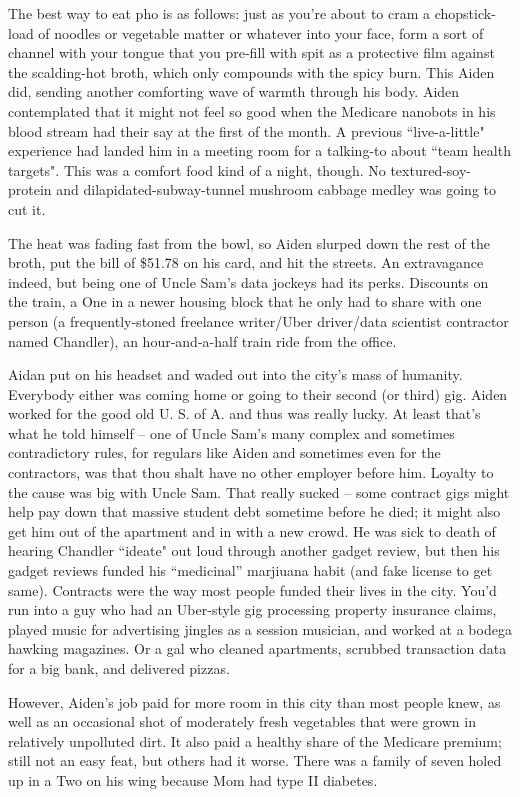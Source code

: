 \documentclass[11pt]{book}
\begin{document}
	The best way to eat pho is as follows: just as you're about to cram a chopstick-load of noodles or vegetable matter or whatever into your face, form a sort of channel with your tongue that you pre-fill with spit as a protective film against the scalding-hot broth, which only compounds with the spicy burn. This Aiden did, sending another comforting wave of warmth through his body. Aiden contemplated that it might not feel so good when the Medicare nanobots in his blood stream had their say at the first of the month. A previous ``live-a-little" experience had landed him in a meeting room for a talking-to about ``team health targets". This was a comfort food kind of a night, though. No textured-soy-protein and dilapidated-subway-tunnel mushroom cabbage medley was going to cut it.
	
	The heat was fading fast from the bowl, so Aiden slurped down the rest of the broth, put the bill of \$51.78 on his card, and hit the streets. An extravagance indeed, but being one of Uncle Sam's data  jockeys had its perks. Discounts on the train, a One in a newer housing block that he only had to share with one person (a frequently-stoned freelance writer/Uber driver/data scientist contractor named Chandler), an hour-and-a-half train ride from the office.
	
	Aidan put on his headset and waded out into the city's mass of humanity. Everybody either was coming home or going to their second (or third) gig. Aiden worked for the good old U. S. of A. and thus was really lucky. At least that's what he told himself -- one of Uncle Sam's many complex and sometimes contradictory rules, for regulars like Aiden and sometimes even for the contractors, was that thou shalt have no other employer before him. Loyalty to the cause was big with Uncle Sam. That really sucked -- some contract gigs might help pay down that massive student debt sometime before he died; it might also get him out of the apartment and in with a new crowd. He was sick to death of hearing Chandler ``ideate" out loud through another gadget review, but then his gadget reviews funded his ``medicinal'' marjiuana habit (and fake license to get same). Contracts were the way most people funded their lives in the city. You'd run into a guy who had an Uber-style gig processing property insurance claims, played music for advertising jingles as a session musician, and worked at a bodega hawking magazines. Or a gal who cleaned apartments, scrubbed transaction data for a big bank, and delivered pizzas.
	
	However, Aiden's job paid for more room in this city than most people knew, as well as an occasional shot of moderately fresh vegetables that were grown in relatively unpolluted dirt. It also paid a healthy share of the Medicare premium; still not an easy feat, but others had it worse. There was a family of seven holed up in a Two on his wing because Mom had type II diabetes.
	
\end{document}

